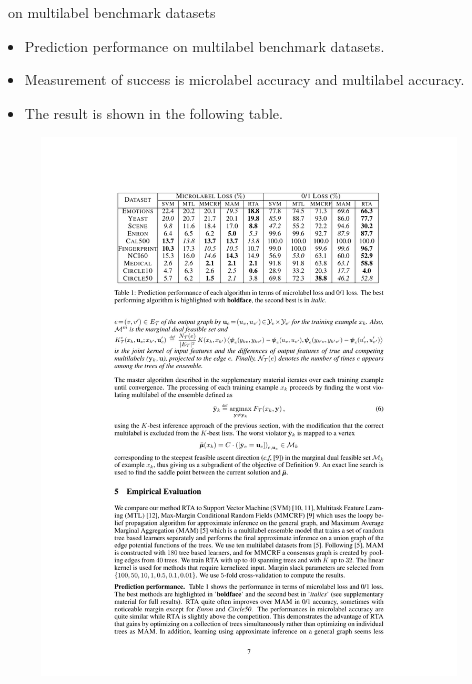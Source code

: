 \documentclass[first=dgreen,second=purple,logo=yellowexc]{aaltoslides}
\begin{document}
%
\begin{frame}{\rta\ on multilabel benchmark datasets}
	\begin{itemize}\footnotesize
		\item Prediction performance on multilabel benchmark datasets.
		\item Measurement of success is microlabel accuracy and multilabel accuracy.
		\item The result is shown in the following table.
	\end{itemize}
	\begin{figure}\footnotesize
		\begin{center}
			\includegraphics[width=11cm]{./result_table.pdf}
		\end{center}
	\end{figure}
\end{frame}
\end{document}

